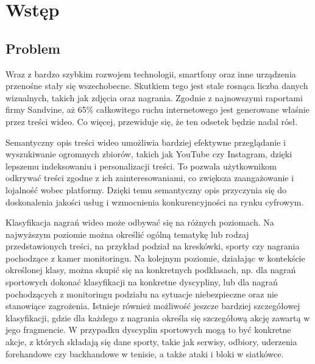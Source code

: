 \newpage %
\section{Wstęp}

\subsection{Problem}
Wraz z bardzo szybkim rozwojem technologii, smartfony oraz inne urządzenia przenośne stały się wszechobecne. Skutkiem tego jest stale rosnąca liczba danych wizualnych, takich jak zdjęcia oraz nagrania. Zgodnie z najnowszymi raportami firmy Sandvine\cite{sandvine}, aż 65\% całkowitego ruchu internetowego jest generowane właśnie przez treści wideo. Co więcej, przewiduje się, że ten odsetek będzie nadal rósł.

Semantyczny opis treści wideo umożliwia bardziej efektywne przeglądanie i wyszukiwanie ogromnych zbiorów, takich jak YouTube czy Instagram, dzięki lepszemu indeksowaniu i personalizacji treści. To pozwala użytkownikom odkrywać treści zgodne z ich zainteresowaniami, co zwiększa zaangażowanie i lojalność wobec platformy. Dzięki temu semantyczny opis przyczynia się do doskonalenia jakości usług i wzmocnienia konkurencyjności na rynku cyfrowym.

Klasyfikacja nagrań wideo może odbywać się na różnych poziomach. Na najwyższym poziomie można określić ogólną tematykę lub rodzaj przedstawionych treści, na przykład podział na kreskówki, sporty czy nagrania pochodzące z kamer monitoringu. Na kolejnym poziomie, działając w kontekście określonej klasy, można skupić się na konkretnych podklasach, np. dla nagrań sportowych dokonać klasyfikacji na konkretne dyscypliny, lub dla nagrań pochodzących z monitoringu podziału na sytuacje niebezpieczne oraz nie stanowiące zagrożenia. Istnieje również możliwość jeszcze bardziej szczegółowej klasyfikacji, gdzie dla każdego z nagrania określa się szczegółową akcję zawartą w jego fragmencie. W przypadku dyscyplin sportowych mogą to być konkretne akcje, z których składają się dane sporty, takie jak serwisy, odbiory, uderzenia forehandowe czy backhandowe w tenisie, a także ataki i bloki w siatkówce. 

